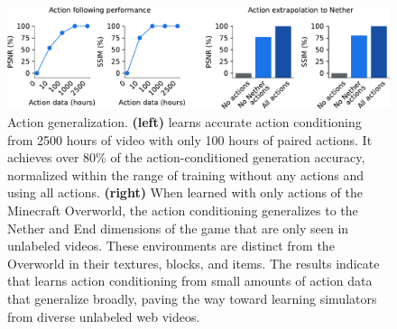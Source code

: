 \begin{figure}[t!]
\centering
\includegraphics[width=\linewidth]{figures/actgen/actgen}
\caption{
Action generalization.
\textbf{(left)}
\method learns accurate action conditioning from 2500 hours of video with only 100 hours of paired actions.
It achieves over 80\% of the action-conditioned generation accuracy, normalized within the range of training without any actions and using all actions.
\textbf{(right)}
When learned with only actions of the Minecraft Overworld, the action conditioning generalizes to the Nether and End dimensions of the game that are only seen in unlabeled videos.
These environments are distinct from the Overworld in their textures, blocks, and items.
The results indicate that \method learns action conditioning from small amounts of action data that generalize broadly, paving the way toward learning simulators from diverse unlabeled web videos.
}
\label{fig:actgen}
\end{figure}